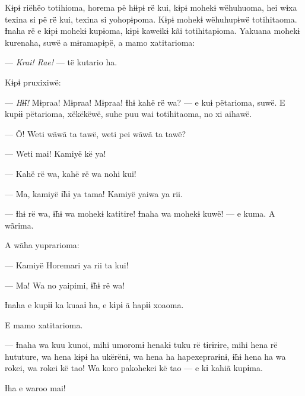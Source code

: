 Kɨpɨ riëhëo totihioma, horema pë hɨɨpɨ rë kui, kɨpɨ mohekɨ wëhuhuoma,
hei wɨxa texina si pë rë kui, texina si yohopɨpoma. Kɨpɨ mohekɨ
wëhuhupɨwë totihitaoma. Ɨnaha rë e kɨpɨ mohekɨ kupɨoma, kɨpɨ kaweikɨ kãi
totihitapɨoma. Yakuana mohekɨ kurenaha, suwë a mɨramapɨpë, a mamo
xatitarioma: 

--- \textit{Krai! Rae!} --- të kutario ha. 

Kɨpɨ pruxixiwë: 

--- \textit{Hɨ̃ɨ!} Mɨpraa! Mɨpraa! Mɨpraa! Ɨhɨ kahë rë wa? --- e kuɨ pëtarioma,
 suwë. E kupɨɨ pëtarioma, xëkëkëwë, suhe puu wai totihitaoma, no xi
 aihawë. 

--- Õ! Weti wãwã ta tawë, weti pei wãwã ta tawë?


--- Weti mai! Kamiyë kë ya!

--- Kahë rë wa, kahë rë wa nohi kui!

--- Ma, kamiyë ɨ̃hɨ ya tama! Kamiyë yaiwa ya rii.

--- Ɨhɨ rë wa, ɨ̃hɨ wa mohekɨ katitire! Ɨnaha wa mohekɨ kuwë! --- e kuma.
A wãrima. 

A wãha yuprarioma: 

--- Kamiyë Horemari ya rii ta kui!

--- Ma! Wa no yaipimi, ɨ̃hɨ rë wa! 

Ɨnaha e kupɨɨ ka kuaaɨ ha, e kɨpɨ ã hapɨɨ xoaoma. 

E mamo xatitarioma. 

--- Ɨnaha wa kuu kunoi, mihi umoromɨ henakɨ tuku rë tɨrɨrɨre, mihi hena
rë hututure, wa hena kɨpɨ ha ukërënɨ, wa hena ha hapexeprarɨnɨ, ɨ̃hɨ hena
ha wa rokei, wa rokei kë tao! Wa koro pakohekei kë tao --- e kɨ kahiã
kupɨma.


Ɨha e waroo mai! 


